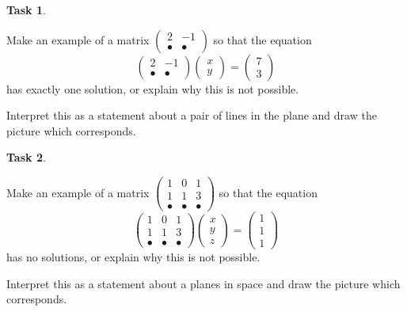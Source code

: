 \documentclass[10pt,]{book}
\theoremstyle{plain}
\theoremstyle{definition}
\numberwithin{equation}{section}
\newtheorem{task}{Task}[chapter]
\begin{document}
\begin{task}
\label{task-25}

          Make an example of a matrix \(\left( \begin{smallmatrix} 2 & -1 \\
          \bullet & \bullet \end{smallmatrix}\right)\) so that the equation\[
            \begin{pmatrix} 2 & -1 \\ \bullet & \bullet \end{pmatrix}
            \begin{pmatrix} x \\ y \end{pmatrix} = \begin{pmatrix} 7 \\ 3
            \end{pmatrix}
          \]
          has exactly one solution, or explain why this is not possible.
\par

          Interpret this as a statement about a pair of lines in the plane and
          draw the picture which corresponds.
\end{task}
\begin{task}
\label{task-26}

          Make an example of a matrix \(\left( \begin{smallmatrix} 1 & 0
          & 1\\ 1 & 1 & 3 \\ \bullet & \bullet & \bullet
          \end{smallmatrix}\right)\) so that the equation\[
            \begin{pmatrix} 1 & 0 & 1\\ 1 & 1 & 3 \\ \bullet
            & \bullet & \bullet \end{pmatrix}\begin{pmatrix} x \\ y \\ z
            \end{pmatrix} = \begin{pmatrix} 1 \\ 1 \\ 1 \end{pmatrix}
          \]
          has no solutions, or explain why this is not possible.
\par

          Interpret this as a statement about a planes in space and
          draw the picture which corresponds.
\end{task}
\end{document}
